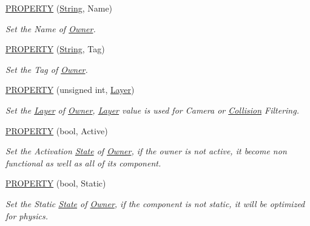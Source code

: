 \begin{DoxyCompactItemize}
\item 
\hyperlink{class_magnum_1_1_component_1_1_owner_a619164b31cc171b995af57a274582daa}{P\+R\+O\+P\+E\+R\+TY} (\hyperlink{class_magnum_1_1_string}{String}, Name)
\begin{DoxyCompactList}\small\item\em Set the Name of \hyperlink{class_magnum_1_1_component_1_1_owner}{Owner}. \end{DoxyCompactList}\item 
\hyperlink{class_magnum_1_1_component_1_1_owner_a207f8d1f1003f66cbcb74be31eab6fd1}{P\+R\+O\+P\+E\+R\+TY} (\hyperlink{class_magnum_1_1_string}{String}, Tag)
\begin{DoxyCompactList}\small\item\em Set the Tag of \hyperlink{class_magnum_1_1_component_1_1_owner}{Owner}. \end{DoxyCompactList}\item 
\hyperlink{class_magnum_1_1_component_1_1_owner_a0d185a08081f3426e5d92264ab240331}{P\+R\+O\+P\+E\+R\+TY} (unsigned int, \hyperlink{class_magnum_1_1_layer}{Layer})
\begin{DoxyCompactList}\small\item\em Set the \hyperlink{class_magnum_1_1_layer}{Layer} of \hyperlink{class_magnum_1_1_component_1_1_owner}{Owner}, \hyperlink{class_magnum_1_1_layer}{Layer} value is used for Camera or \hyperlink{class_magnum_1_1_collision}{Collision} Filtering. \end{DoxyCompactList}\item 
\hyperlink{class_magnum_1_1_component_1_1_owner_aec6c47111d6f1d92cfadd446e3a77f81}{P\+R\+O\+P\+E\+R\+TY} (bool, Active)
\begin{DoxyCompactList}\small\item\em Set the Activation \hyperlink{class_magnum_1_1_state}{State} of \hyperlink{class_magnum_1_1_component_1_1_owner}{Owner}, if the owner is not active, it become non functional as well as all of its component. \end{DoxyCompactList}\item 
\hyperlink{class_magnum_1_1_component_1_1_owner_a2f21802f16d84f0458640ce87f8398df}{P\+R\+O\+P\+E\+R\+TY} (bool, Static)
\begin{DoxyCompactList}\small\item\em Set the Static \hyperlink{class_magnum_1_1_state}{State} of \hyperlink{class_magnum_1_1_component_1_1_owner}{Owner}, if the component is not static, it will be optimized for physics. \end{DoxyCompactList}\item 

\end{DoxyCompactItemize}
